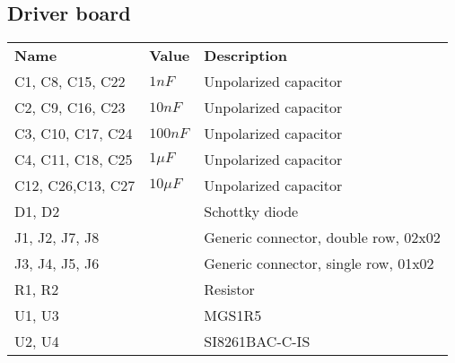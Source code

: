 \subsection{Driver board}
\begin{table}[H]
\centering
\small
\begin{tabular}{p{4cm} p{1.5cm} p{8cm}}
\textbf{Name}     & \textbf{Value} & \textbf{Description}              \\
C1, C8, C15, C22  & $1nF$       & Unpolarized capacitor                \\
C2, C9, C16, C23  & $10nF$      & Unpolarized capacitor                \\
C3, C10, C17, C24 & $100nF$     & Unpolarized capacitor                \\
C4, C11, C18, C25 & $1\mu F$    & Unpolarized capacitor                \\
C12, C26,C13, C27 & $10\mu F$   & Unpolarized capacitor                \\
D1, D2            &             & Schottky diode                       \\
J1, J2, J7, J8    &             & Generic connector, double row, 02x02 \\
J3, J4, J5, J6    &             & Generic connector, single row, 01x02 \\
R1, R2            &             & Resistor                             \\
U1, U3            &             & MGS1R5                               \\
U2, U4            &             & SI8261BAC-C-IS                      
\end{tabular}
\end{table}


